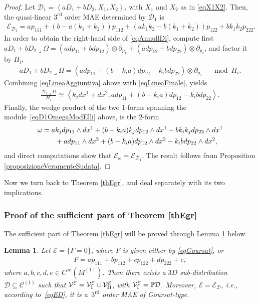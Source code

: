 \documentclass[pdftex]{sigma}
\newcommand{\C}{\mathcal{C}}
\newcommand{\D}{\mathcal{D}}
\newcommand{\M}{\mathcal{V}}
\newcommand{\MM}{\mathcal{V}_{\textrm{\normalfont I}}}
\newcommand{\MMM}{\mathcal{V}_{\textrm{\normalfont II}}}
\newcommand{\E}{\mathcal{E}}
\newcommand{\Span}[1]{\left\langle #1 \right\rangle}
\renewcommand{\P}{\mathbb{P}}
\newcommand{\Rd}{^\textrm{rd}}
\newcommand{\elle}{H}
\numberwithin{equation}{section}
\newtheorem{Lemma}[Theorem]{Lemma}
\begin{document}
\begin{proof}
 Let
$\D_1=\Span{aD_1+bD_2, X_1,X_2}$,
with $X_1$ and $X_2$ as in \eqref{eqX1X2}. Then, the quasi-linear $3\Rd$ order MAE determined by $\D_1$ is
\begin{gather*}
\E_{\D_1}=ap_{111}+(b-a(k_1+k_2))p_{112}+(ak_1k_2-b(k_1+k_2))p_{122}+bk_1k_2p_{222}.
\end{gather*}
In order to obtain the right-hand side of \eqref{eqAnnullDi}, compute f\/irst
$
aD_1+bD_2\lrcorner \Omega = (adp_{11}+bdp_{12})\otimes \partial_{p_1}+(adp_{12}+bdp_{22})\otimes\partial_{p_2}
$,
and factor it by $\elle_i$,
\begin{gather}\label{eqLineaAggiuntiva}
aD_1+bD_2\lrcorner \Omega = (adp_{11}+(b-k_ia)dp_{12}-k_ib dp_{22})\otimes\partial_{p_1}\quad \mod \elle_i.
\end{gather}
Combining \eqref{eqLineaAggiuntiva} above with \eqref{eqLineaFinale}, yields
\begin{gather}\label{eqD1OmegaModElli}
{\frac{\D_1\lrcorner \Omega}{\elle_i}}\simeq\Span{k_jdx^1+dx^2, adp_{11}+(b-k_ia)dp_{12}-k_ib dp_{22}}.
\end{gather}
Finally, the wedge product of the two 1-forms spanning the module~\eqref{eqD1OmegaModElli} above, is the 2-form
\begin{gather*}
\omega= ak_jdp_{11}\wedge dx^1+(b-k_ia)k_jdp_{12}\wedge dx^1-bk_ik_jdp_{22}\wedge dx^1 \\
\hphantom{\omega=}{} + adp_{11}\wedge dx^2+(b-k_ia)dp_{12}\wedge dx^2-k_ibdp_{22}\wedge dx^2,
\end{gather*}
and direct computations show that
$
\E_\omega=\E_{\D_1}
$.
The result follows from Proposition \ref{proposizioneVeramenteSudata}.
\end{proof}

Now we turn back to Theorem \ref{thEgr}, and deal separately with its two implications.

\subsubsection{Proof of the suf\/f\/icient part of Theorem \ref{thEgr}}

The suf\/f\/icient part of Theorem \ref{thEgr} will be proved through Lemma \ref{LemQLsonoMonge} below.

\begin{Lemma}\label{LemQLsonoMonge}
 Let $\E=\{F=0\}$, where $F$ is given either by \eqref{eqGoursat},
 or
 \begin{gather}\label{eqGenQL}
F=ap_{111}+bp_{112}+cp_{122}+dp_{222}+e,
\end{gather}
where $a,b,c,d,e\in C^\infty(M^{(1)})$.
Then there exists a $3D$ sub-distribution $\D\subseteq\C^{(1)}$ such that $\M^\E=\MM^\E\cup\MMM^\E$, with $\MM^\E=\P\D$. Moreover, $\E=\E_\D$, i.e., according to~\eqref{eqED}, it is a~$3\Rd$ order MAE of Goursat-type.
\end{Lemma}
\end{document}
